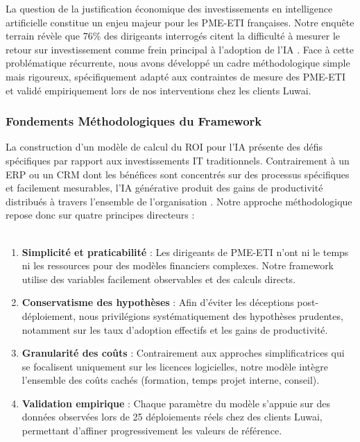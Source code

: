 La question de la justification économique des investissements en intelligence artificielle constitue un enjeu majeur pour les PME-ETI françaises. Notre enquête terrain révèle que 76\% des dirigeants interrogés citent la difficulté à mesurer le retour sur investissement comme frein principal à l'adoption de l'IA \cite{kaplan1996balanced}. Face à cette problématique récurrente, nous avons développé un cadre méthodologique simple mais rigoureux, spécifiquement adapté aux contraintes de mesure des PME-ETI et validé empiriquement lors de nos interventions chez les clients Luwai.

\subsubsection{Fondements Méthodologiques du Framework}

La construction d'un modèle de calcul du ROI pour l'IA présente des défis spécifiques par rapport aux investissements IT traditionnels. Contrairement à un ERP ou un CRM dont les bénéfices sont concentrés sur des processus spécifiques et facilement mesurables, l'IA générative produit des gains de productivité distribués à travers l'ensemble de l'organisation \cite{brynjolfsson2017business}. Notre approche méthodologique repose donc sur quatre principes directeurs :
\\\\
\begin{enumerate}
    \item \textbf{Simplicité et praticabilité} : Les dirigeants de PME-ETI n'ont ni le temps ni les ressources pour des modèles financiers complexes. Notre framework utilise des variables facilement observables et des calculs directs.
    
    \item \textbf{Conservatisme des hypothèses} : Afin d'éviter les déceptions post-déploiement, nous privilégions systématiquement des hypothèses prudentes, notamment sur les taux d'adoption effectifs et les gains de productivité.
    
    \item \textbf{Granularité des coûts} : Contrairement aux approches simplificatrices qui se focalisent uniquement sur les licences logicielles, notre modèle intègre l'ensemble des coûts cachés (formation, temps projet interne, conseil).
    
    \item \textbf{Validation empirique} : Chaque paramètre du modèle s'appuie sur des données observées lors de 25 déploiements réels chez des clients Luwai, permettant d'affiner progressivement les valeurs de référence.
\end{enumerate}

